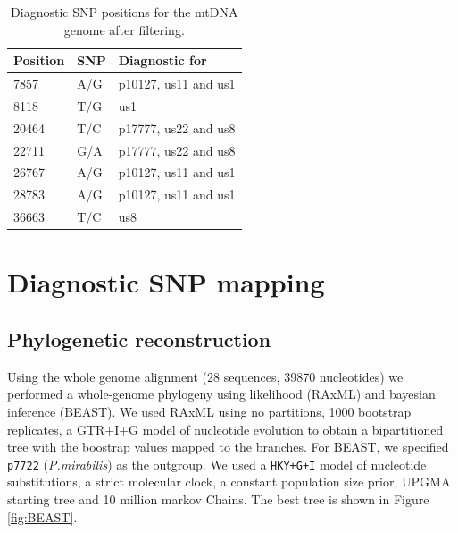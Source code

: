 \documentclass{article}\usepackage[]{graphicx}\usepackage[]{color}
\begin{document}
\begin{table}[h!]
\centering
\caption{Diagnostic SNP positions for the mtDNA genome after filtering.}
\begin{tabular}{@{}lll@{}}
\toprule
Position & SNP & Diagnostic for       \\ \midrule
7857     & A/G & p10127, us11 and us1 \\
8118     & T/G & us1                  \\
20464    & T/C & p17777, us22 and us8 \\
22711    & G/A & p17777, us22 and us8 \\
26767    & A/G & p10127, us11 and us1 \\
28783    & A/G & p10127, us11 and us1 \\
36663    & T/C & us8                  \\ \bottomrule
\end{tabular}
\label{table:DiagSNP}
\end{table}

\section{Diagnostic SNP mapping} 
\subsection{Phylogenetic reconstruction}
Using the whole genome alignment (28 sequences, 39870 nucleotides) we performed a whole-genome phylogeny using likelihood (RAxML) and bayesian inference (BEAST). We used RAxML using no partitions, 1000 bootstrap replicates, a GTR+I+G model of nucleotide evolution to obtain a bipartitioned tree with the boostrap values mapped to the branches. For BEAST, we specified \texttt{p7722} (\emph{P.mirabilis}) as the outgroup. We used a \texttt{HKY+G+I} model of nucleotide substitutions, a strict molecular clock, a constant population size prior, UPGMA starting tree and 10 million markov Chains. The best tree is shown in Figure \ref{fig:BEAST}.
\end{document}
